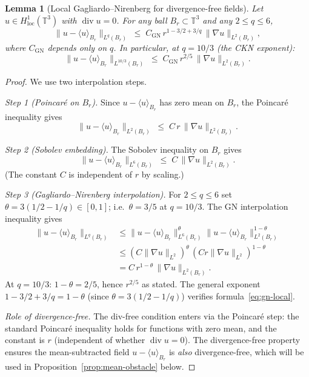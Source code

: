 \documentclass[11pt]{article}
\newtheorem{lemma}[theorem]{Lemma}
\theoremstyle{definition}
\theoremstyle{remark}
\newcommand{\T}{\mathbb{T}}
\begin{document}
\begin{lemma}[Local Gagliardo--Nirenberg for divergence-free fields]
\label{lem:gn-divfree}
  Let $u\in H^1_{\mathrm{loc}}(\T^3)$ with $\operatorname{div} u = 0$.
  For any ball $B_r\subset\T^3$ and any $2\leq q\leq 6$,
  \begin{equation}\label{eq:gn-local}
    \|u - \langle u\rangle_{B_r}\|_{L^q(B_r)}
    \;\leq\; C_{\mathrm{GN}}\,r^{1-3/2+3/q}\,\|\nabla u\|_{L^2(B_r)},
  \end{equation}
  where $C_{\mathrm{GN}}$ depends only on $q$.
  In particular, at $q=10/3$ (the CKN exponent):
  \begin{equation}\label{eq:gn-103}
    \|u - \langle u\rangle_{B_r}\|_{L^{10/3}(B_r)}
    \;\leq\; C_{\mathrm{GN}}\,r^{2/5}\,\|\nabla u\|_{L^2(B_r)}.
  \end{equation}
\end{lemma}

\begin{proof}
  We use two interpolation steps.

  \emph{Step 1 (Poincaré on $B_r$).}
  Since $u - \langle u\rangle_{B_r}$ has zero mean on $B_r$,
  the Poincaré inequality gives
  \[
    \|u - \langle u\rangle_{B_r}\|_{L^2(B_r)} \;\leq\; C\,r\,\|\nabla u\|_{L^2(B_r)}.
  \]

  \emph{Step 2 (Sobolev embedding).}
  The Sobolev inequality on $B_r$ gives
  \[
    \|u - \langle u\rangle_{B_r}\|_{L^6(B_r)} \;\leq\; C\,\|\nabla u\|_{L^2(B_r)}.
  \]
  (The constant $C$ is independent of $r$ by scaling.)

  \emph{Step 3 (Gagliardo--Nirenberg interpolation).}
  For $2\leq q\leq 6$ set $\theta = 3(1/2 - 1/q)\in[0,1]$; i.e.\ $\theta = 3/5$ at $q=10/3$.
  The GN interpolation inequality gives
  \begin{align*}
    \|u-\langle u\rangle_{B_r}\|_{L^q(B_r)}
    &\leq \|u-\langle u\rangle_{B_r}\|_{L^6(B_r)}^{\theta}
           \|u-\langle u\rangle_{B_r}\|_{L^2(B_r)}^{1-\theta} \\
    &\leq (C\|\nabla u\|_{L^2})^{\theta}\,(Cr\|\nabla u\|_{L^2})^{1-\theta} \\
    &= C\,r^{1-\theta}\,\|\nabla u\|_{L^2(B_r)}.
  \end{align*}
  At $q=10/3$: $1-\theta = 2/5$, hence $r^{2/5}$ as stated.
  The general exponent $1-3/2+3/q = 1 - \theta$ (since $\theta=3(1/2-1/q)$) verifies
  formula~\eqref{eq:gn-local}.

  \emph{Role of divergence-free.}
  The div-free condition enters via the Poincaré step: the standard Poincaré inequality
  holds for functions with zero mean, and the constant is $r$ (independent of whether
  $\operatorname{div} u=0$).  The divergence-free property ensures the mean-subtracted field
  $u - \langle u\rangle_{B_r}$ is \emph{also} divergence-free, which will be used in
  Proposition~\ref{prop:mean-obstacle} below.
\end{proof}
\end{document}
